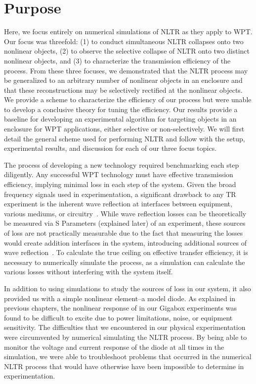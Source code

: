 \section{Purpose}
\label{sec:numerical-purpose}

Here, we focus entirely on numerical simulations of NLTR as they apply to WPT. Our focus was threefold: (1) to conduct simultaneous NLTR collapses onto two nonlinear objects, (2) to observe the selective collapse of NLTR onto two distinct nonlinear objects, and (3) to characterize the transmission efficiency of the process. From these three focuses, we demonstrated that the NLTR process may be generalized to an arbitrary number of nonlinear objects in an enclosure and that these reconstructions may be selectively rectified at the nonlinear objects. We provide a scheme to characterize the efficiency of our process but were unable to develop a conclusive theory for tuning the efficiency. Our results provide a baseline for developing an experimental algorithm for targeting objects in an enclosure for WPT applications, either selective or non-selectively.  We will first detail the general scheme used for performing NLTR and follow with the setup, experimental results, and discussion for each of our three focus topics.

The process of developing a new technology required benchmarking each step diligently. Any successful WPT technology must have effective transmission efficiency, implying minimal loss in each step of the system. Given the broad frequency signals used in experimentation, a significant drawback to any TR experiment is the inherent wave reflection at interfaces between equipment, various mediums, or circuitry~\cite{smith_waves_2010,griffiths_david_introduction_1999}. While wave reflection losses can be theoretically be measured via S Parameters (explained later) of an experiment, these sources of loss are not practically measurable due to the fact that measuring the losses would create addition interfaces in the system, introducing additional sources of wave reflection~\cite{smith_waves_2010}. To calculate the true ceiling on effective transfer efficiency, it is necessary to numerically simulate the process, as a simulation can calculate the various losses without interfering with the system itself.

In addition to using simulations to study the sources of loss in our system, it also provided us with a simple nonlinear element--a model diode. As explained in previous chapters, the nonlinear response of in our Gigabox experiments was found to be difficult to excite due to power limitations, noise, or equipment sensitivity. The difficulties that we encountered in our physical experimentation were circumvented by numerical simulating the NLTR process. By being able to monitor the voltage and current response of the diode at all times in the simulation, we were able to troubleshoot problems that occurred in the numerical NLTR process that would have otherwise have been impossible to determine in experimentation.

